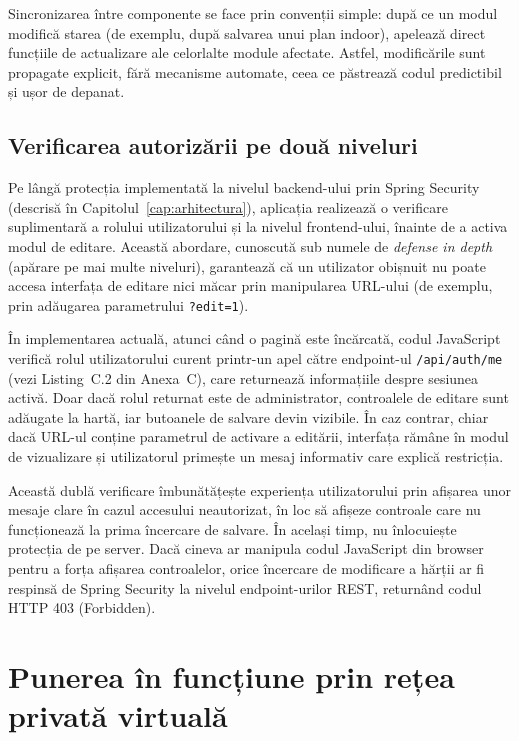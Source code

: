 Sincronizarea între componente se face prin convenții simple: după ce un modul
modifică starea (de exemplu, după salvarea unui plan indoor), apelează direct
funcțiile de actualizare ale celorlalte module afectate. Astfel, modificările
sunt propagate explicit, fără mecanisme automate, ceea ce
păstrează codul predictibil și ușor de depanat.
 
\subsection{Verificarea autorizării pe două niveluri}
\label{subsec:dubla-verificare}
 
Pe lângă protecția implementată la nivelul backend-ului prin Spring Security
(descrisă în Capitolul~\ref{cap:arhitectura}), aplicația realizează o
verificare suplimentară a rolului utilizatorului și la nivelul frontend-ului,
înainte de a activa modul de editare. Această abordare, cunoscută sub numele
de \textit{defense in depth} (apărare pe mai multe niveluri), garantează că
un utilizator obișnuit nu poate accesa interfața de editare nici măcar prin
manipularea URL-ului (de exemplu, prin adăugarea parametrului \texttt{?edit=1}).
 
În implementarea actuală, atunci când o pagină este încărcată, codul JavaScript
verifică rolul utilizatorului curent printr-un apel către endpoint-ul
\texttt{/api/auth/me} (vezi Listing~C.2 din Anexa~C), care returnează informațiile despre sesiunea activă.
Doar dacă rolul returnat este de administrator, controalele de editare sunt
adăugate la hartă, iar butoanele de salvare devin vizibile. În caz contrar,
chiar dacă URL-ul conține parametrul de activare a editării, interfața rămâne
în modul de vizualizare și utilizatorul primește un mesaj informativ care
explică restricția.
 
Această dublă verificare îmbunătățește experiența utilizatorului prin
afișarea unor mesaje clare în cazul accesului neautorizat, în loc să afișeze
controale care nu funcționează la prima încercare de salvare. În același timp,
nu înlocuiește protecția de pe server. Dacă cineva ar manipula codul
JavaScript din browser pentru a forța afișarea controalelor, orice încercare
de modificare a hărții ar fi respinsă de Spring Security la nivelul
endpoint-urilor REST, returnând codul HTTP 403 (Forbidden).


\section{Punerea în funcțiune prin rețea privată virtuală}
\label{sec:deployment-impl}


